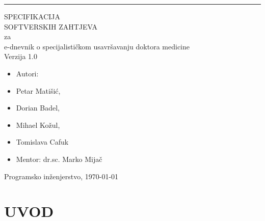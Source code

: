\documentclass{scrreprt}
\date{}
\def\myversion{1.0 }
\begin{document}
\begin{flushright}
    \rule{16cm}{5pt}\vskip1cm
    \begin{bfseries}
        \Huge{SPECIFIKACIJA\\ SOFTVERSKIH ZAHTJEVA}\\
        \vspace{1cm}
        za\\
        \vspace{1cm}
         e-dnevnik o specijalističkom usavršavanju doktora medicine\\
        \vspace{1cm}
        \LARGE{Verzija \myversion}\\
        \vspace{1cm}
        \begin{itemize}
        \item Autori:
        \item[] Petar Matišić,
        \item[] Dorian Badel,
        \item[] Mihael Kožul,
        \item[] Tomislava Cafuk\\
        \item Mentor: dr.sc. Marko Mijač
        \end{itemize}
        \vspace{1.8cm}
    \end{bfseries}
\end{flushright}
\begin{center} \large{Programsko inženjerstvo}, \today \end{center}
\thispagestyle{empty}

\tableofcontents
\thispagestyle{empty}

\chapter{UVOD}

\setcounter{page}{3}
\end{document}
